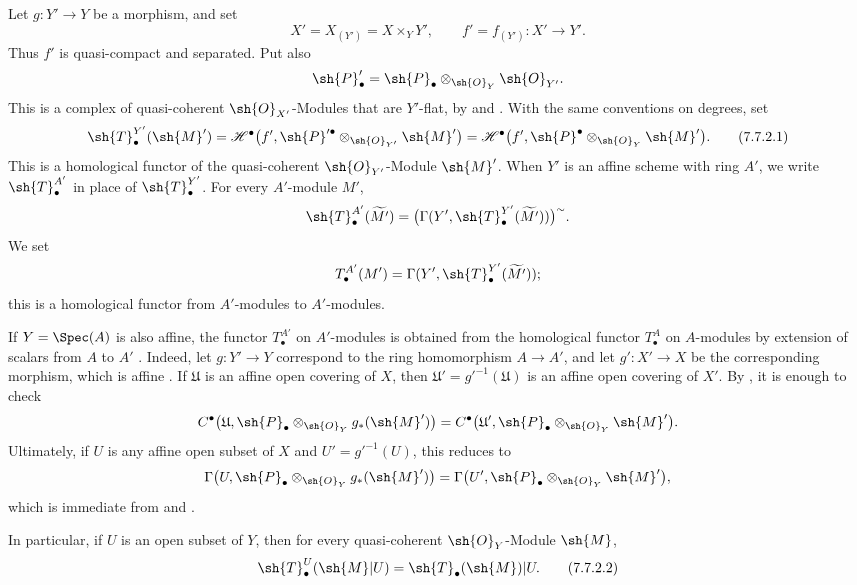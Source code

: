 \begin{env}[7.7.2]
\label{III.7.7.2}
Let $g:Y'\to Y$ be a morphism, and set
\[
  X'=X_{(Y')}=X\times_Y Y',
  \qquad
  f'=f_{(Y')}:X'\longrightarrow Y'.
\]
Thus $f'$ is quasi-compact and separated.  Put also
\[
  \sh{P}'_\bullet
  =\sh{P}_\bullet\otimes_{\sh{O}_Y}\sh{O}_{Y'}.
\]
This is a complex of quasi-coherent $\sh{O}_{X'}$-Modules
that are $Y'$-flat, by  and
.  With the same conventions on degrees, set
\[
  \sh{T}^{Y'}_\bullet(\sh{M}')
  =
  \mathscr{H}^\bullet
    \bigl(f',
      \sh{P}'^\bullet\otimes_{\sh{O}_{Y'}}\sh{M}'\bigr)
  =
  \mathscr{H}^\bullet
    \bigl(f',
      \sh{P}^\bullet\otimes_{\sh{O}_Y}\sh{M}'\bigr).
  \tag{7.7.2.1}\label{III.7.7.2.1}
\]
This is a homological functor of the quasi-coherent
$\sh{O}_{Y'}$-Module $\sh{M}'$.  When $Y'$ is an affine
scheme with ring $A'$, we write $\sh{T}^{A'}_\bullet$ in
place of $\sh{T}^{Y'}_\bullet$.  For every $A'$-module $M'$,
\[
  \sh{T}^{A'}_\bullet(\widetilde{M'})
  =
  \bigl(
    \Gamma(Y',
      \sh{T}^{Y'}_\bullet(\widetilde{M'}))
  \bigr)^\sim.
\]
We set
\[
  T^{A'}_\bullet(M')
  =
  \Gamma(Y',
    \sh{T}^{Y'}_\bullet(\widetilde{M'}));
\]
this is a homological functor from $A'$-modules to
$A'$-modules.

If $Y=\Spec(A)$ is also affine, the functor
$T^{A'}_\bullet$ on $A'$-modules is obtained from the
homological functor $T^A_\bullet$ on $A$-modules by extension
of scalars from $A$ to $A'$ .  Indeed, let
$g:Y'\to Y$ correspond to the ring homomorphism $A\to A'$,
and let $g':X'\to X$ be the corresponding morphism, which is
affine .  If $\mathfrak U$ is an affine
open covering of $X$, then
$\mathfrak U'=g'^{-1}(\mathfrak U)$ is an affine open
covering of $X'$.  By , it is enough to check
\[
  C^\bullet
  \bigl(\mathfrak U,
    \sh{P}_\bullet\otimes_{\sh{O}_Y}g_*(\sh{M}')\bigr)
  =
  C^\bullet
  \bigl(\mathfrak U',
    \sh{P}_\bullet\otimes_{\sh{O}_Y}\sh{M}'\bigr).
\]
Ultimately, if $U$ is any affine open subset of $X$ and
$U'=g'^{-1}(U)$, this reduces to
\[
  \Gamma
  \bigl(U,
    \sh{P}_\bullet\otimes_{\sh{O}_Y}g_*(\sh{M}')\bigr)
  =
  \Gamma
  \bigl(U',
    \sh{P}_\bullet\otimes_{\sh{O}_Y}\sh{M}'\bigr),
\]
which is immediate from  and .

In particular, if $U$ is an open subset of $Y$, then for
every quasi-coherent $\sh{O}_Y$-Module $\sh{M}$,
\[
  \sh{T}^U_\bullet(\sh{M}|U)
  =
  \sh{T}_\bullet(\sh{M})|U.
  \tag{7.7.2.2}\label{III.7.7.2.2}
\]
\end{env}

